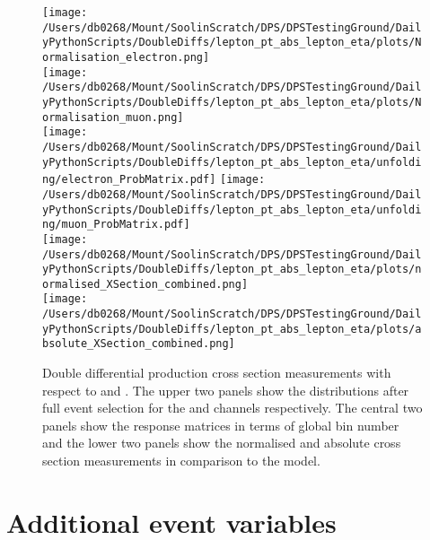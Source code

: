 \begin{figure}[htpb]
	\centering
	\texttt{[image: /Users/db0268/Mount/SoolinScratch/DPS/DPSTestingGround/DailyPythonScripts/DoubleDiffs/lepton\_pt\_abs\_lepton\_eta/plots/Normalisation\_electron.png]} \\
	\texttt{[image: /Users/db0268/Mount/SoolinScratch/DPS/DPSTestingGround/DailyPythonScripts/DoubleDiffs/lepton\_pt\_abs\_lepton\_eta/plots/Normalisation\_muon.png]} \\
	\vspace{0.8cm}
	\texttt{[image: /Users/db0268/Mount/SoolinScratch/DPS/DPSTestingGround/DailyPythonScripts/DoubleDiffs/lepton\_pt\_abs\_lepton\_eta/unfolding/electron\_ProbMatrix.pdf]}
	\texttt{[image: /Users/db0268/Mount/SoolinScratch/DPS/DPSTestingGround/DailyPythonScripts/DoubleDiffs/lepton\_pt\_abs\_lepton\_eta/unfolding/muon\_ProbMatrix.pdf]} \\
	\vspace{0.8cm}
	\texttt{[image: /Users/db0268/Mount/SoolinScratch/DPS/DPSTestingGround/DailyPythonScripts/DoubleDiffs/lepton\_pt\_abs\_lepton\_eta/plots/normalised\_XSection\_combined.png]} \\
	\texttt{[image: /Users/db0268/Mount/SoolinScratch/DPS/DPSTestingGround/DailyPythonScripts/DoubleDiffs/lepton\_pt\_abs\_lepton\_eta/plots/absolute\_XSection\_combined.png]} \\
	\vspace{0.4cm}
	\caption[Double differential \ttbar{} production cross section measurements with respect to \LPT{} and \LETA{}. The upper two panels show the distributions after full event selection for the \eJets{} and \muJets{} channels respectively. The central two panels show the response matrices in terms of global bin number and the lower two panels show the normalised and absolute cross section measurements in comparison to the \powhegpythia{} model.]{Double differential \ttbar{} production cross section measurements with respect to \LPT{} and \LETA{}. The upper two panels show the distributions after full event selection for the \eJets{} and \muJets{} channels respectively. The central two panels show the response matrices in terms of global bin number and the lower two panels show the normalised and absolute cross section measurements in comparison to the \powhegpythia{} model.}
	\label{fig:LPT_LETA}
\end{figure}


\section{Additional event variables} %
\label{sec:additional_event_variables}

